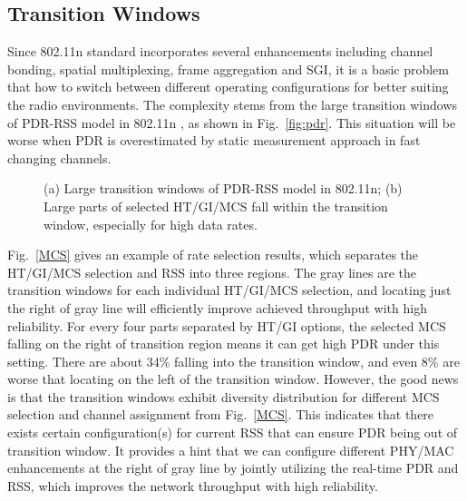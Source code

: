 \documentclass[draftclsnofoot,journal,onecolumn,11pt]{IEEEtran}
\begin{document}
\subsection{Transition Windows}
Since 802.11n standard incorporates several enhancements including channel bonding, spatial multiplexing, frame aggregation and SGI, it is a basic problem that how to switch between different operating configurations for better suiting the radio environments. The complexity stems from the large transition windows of PDR-RSS model in 802.11n \cite{Halperin2010predictable}, as shown in Fig.~\ref{fig:pdr}. This situation will be worse when PDR is overestimated by static measurement approach in fast changing channels.

\begin{figure}[!htp]
\centerline{
}
\caption{(a) Large transition windows of PDR-RSS model in 802.11n; (b) Large parts of selected HT/GI/MCS fall within the transition window, especially for high data rates.}
\label{pdr-rss}
\end{figure}

Fig.~\ref{MCS} gives an example of rate selection results, which separates the HT/GI/MCS selection and RSS into three regions. The gray lines are the transition windows for each individual HT/GI/MCS selection, and locating just the right of gray line will efficiently improve achieved throughput with high reliability. For every four parts separated by HT/GI options, the selected MCS falling on the right of transition region means it can get high PDR under this setting. There are about 34\% falling into the transition window, and even 8\% are worse that locating on the left of the transition window. However, the good news is that the transition windows exhibit diversity distribution for different MCS selection and channel assignment from Fig.~\ref{MCS}. This indicates that there exists certain configuration(s) for current RSS that can ensure PDR being out of transition window. It provides a hint that we can configure different PHY/MAC enhancements at the right of gray line by jointly utilizing the real-time PDR and RSS, which improves the network throughput with high reliability.
\end{document}
